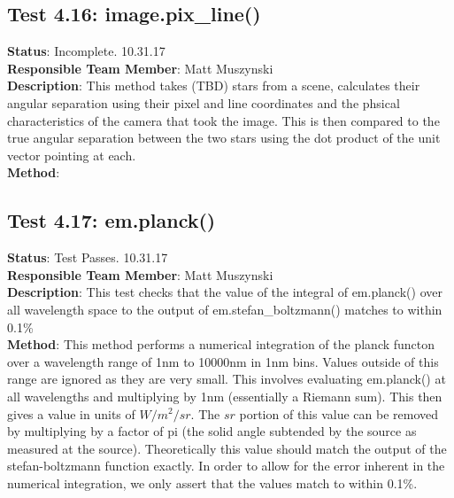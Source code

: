 \documentclass[]{DINOReportMemo}
\begin{document}
\subsection{Test 4.16: image.pix\_line()}
\textbf{Status}: Incomplete. 10.31.17\\
\textbf{Responsible Team Member}: Matt Muszynski \\
\textbf{Description}: This method takes (TBD) stars from a scene, calculates their angular separation using their pixel and line coordinates and the phsical characteristics of the camera that took the image. This is then compared to the true angular separation between the two stars using the dot product of the unit vector pointing at each.\\
\textbf{Method}: \\

\subsection{Test 4.17: em.planck()}
\textbf{Status}: Test Passes. 10.31.17\\
\textbf{Responsible Team Member}: Matt Muszynski \\
\textbf{Description}: This test checks that the value of the integral of em.planck() over all wavelength space to the output of em.stefan\_boltzmann() matches to within 0.1\% \\
\textbf{Method}: This method performs a numerical integration of the planck functon over a wavelength range of 1nm to 10000nm in 1nm bins. Values outside of this range are ignored as they are very small. This involves evaluating em.planck() at all wavelengths and multiplying by 1nm (essentially a Riemann sum). This then gives a value in units of $W/m^2/sr$. The $sr$ portion of this value can be removed by multiplying by a factor of pi (the solid angle subtended by the source as measured at the source). Theoretically this value should match the output of the stefan-boltzmann function exactly. In order to allow for the error inherent in the numerical integration, we only assert that the values match to within 0.1\%.\\
\end{document}
